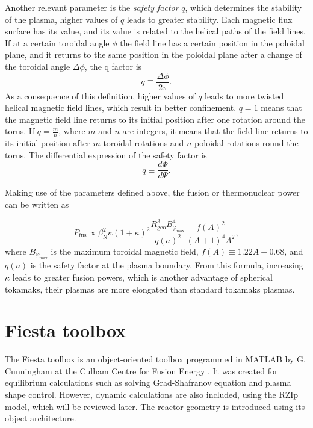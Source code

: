 \documentclass[a4paper,12pt,oneside]{book}
\begin{document}
Another relevant parameter is the \textit{safety factor} $q$, which determines the stability of the plasma, higher values of $q$ leads to greater stability. Each magnetic flux surface has its value, and its value is related to the helical paths of the field lines. If at a certain toroidal angle $\phi$ the field line has a certain position in the poloidal plane, and it returns to the same position in the poloidal plane after a change of the toroidal angle $\Delta \phi$, the q factor is
%
\begin{equation} \label{def q}
q \equiv \dfrac{\Delta \phi}{2 \pi}.
\end{equation}
%
As a consequence of this definition, higher values of $q$ leads to more twisted helical magnetic field lines, which result in better confinement. $q=1$ means that the magnetic field line returns to its initial position after one rotation around the torus. If $q=\frac{m}{n}$, where $m$ and $n$ are integers, it means that the field line returns to its initial position after $m$ toroidal rotations and $n$ poloidal rotations round the torus. The differential expression of the safety factor is
\begin{equation}\label{def q con flujos}
q \equiv \dfrac{d \Phi}{d \Psi}.
\end{equation}

Making use of the parameters defined above, the fusion or thermonuclear power can be written as \cite{FusionPower}

\begin{equation}
P_\text{fus} \propto \beta_\text{N}^2 \kappa (1+\kappa)^2 \dfrac{R_\text{geo}^3 B_{\varphi_\text{max}}^4}{q(a)^2} \dfrac{f(A)^2}{(A+1)^4 A^2},
\end{equation}
where $B_{\varphi_\text{max}}$ is the maximum toroidal magnetic field, $f(A) \equiv 1.22 A-0.68$, and $q(a)$ is the safety factor at the plasma boundary. From this formula, increasing $\kappa$ leads to greater fusion powers, which is another advantage of spherical tokamaks, their plasmas are more elongated than standard tokamaks plasmas.


\chapter{Fiesta toolbox}

The Fiesta toolbox is an object-oriented toolbox programmed in MATLAB by G. Cunningham at the Culham Centre for Fusion Energy \cite{Pangione_Fiesta, Windridge_Fiesta}. It was created for equilibrium calculations such as solving Grad-Shafranov equation and plasma shape control. However, dynamic calculations are also included, using the RZIp model, which will be reviewed later. The reactor geometry is introduced using its object architecture.
\end{document}

